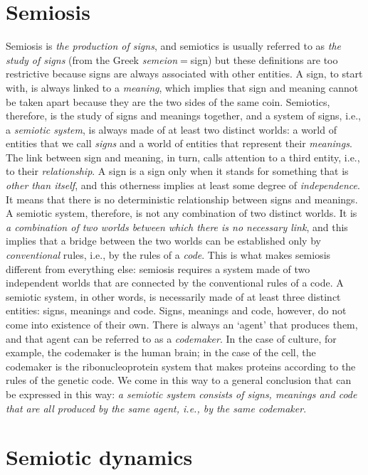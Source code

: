 \documentclass[12pt]{article}
\begin{document}
\section{Semiosis}
Semiosis is \textit{the production of signs}, and semiotics is usually referred to as \textit{the study of signs} (from the Greek \textit{semeion}$=$sign) but these definitions are too restrictive because signs are always associated with other entities. A sign, to start with, is always linked to a \textit{meaning}, which implies that sign and meaning cannot be taken apart because they are the two sides of the same coin. Semiotics, therefore, is the study of signs and meanings together, and a system of signs, i.e., a \textit{semiotic system}, is always made of at least two distinct worlds: a world of entities that we call \textit{signs} and a world of entities that represent their \textit{meanings}. The link between sign and meaning, in turn, calls attention to a third entity, i.e., to their \textit{relationship}. A sign is a sign only when it stands for something that is \textit{other than itself}, and this otherness implies at least some degree of \textit{independence}. It means that there is no deterministic relationship between signs and meanings. A semiotic system, therefore, is not any combination of two distinct worlds. It is \textit{a combination of two worlds between which there is no necessary link}, and this implies that a bridge between the two worlds can be established only by \textit{conventional} rules, i.e., by the rules of a \textit{code}. This is what makes semiosis different from everything else: semiosis requires a system made of two independent worlds that are connected by the conventional rules of a code. A semiotic system, in other words, is necessarily made of at least three distinct entities: signs, meanings and code. Signs, meanings and code, however, do not come into existence of their own. There is always an `agent' that produces them, and that agent can be referred to as a \textit{codemaker}. In the case of culture, for example, the codemaker is the human brain; in the case of the cell, the codemaker is the ribonucleoprotein system that makes proteins according to the rules of the genetic code. We come in this way to a general conclusion that can be expressed in this way: \textit{a semiotic system consists of signs, meanings and code that are all produced by the same agent, i.e., by the same codemaker}.


\hypertarget{semiotic_dynamics}{}
\section{Semiotic dynamics}
\end{document}
